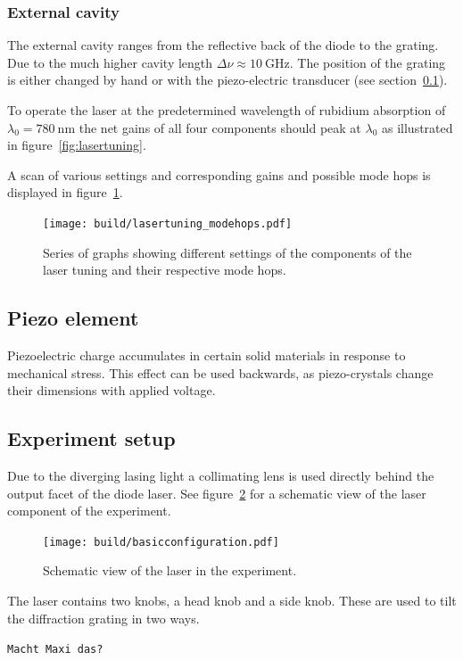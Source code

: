 \subsubsection{External cavity}\label{external-cavity}
The external cavity ranges from the reflective back of the diode to the grating.
Due to the much higher cavity length $\Delta \nu \approx \SI{10}{\giga\hertz}$.
The position of the grating is either changed by hand or with the piezo-electric transducer (see
section~\ref{sub:piezo-element}).

To operate the laser at the predetermined wavelength of rubidium absorption of
$\lambda_0 = \SI{780}{\nano\meter}$ the net gains of all four components should
peak at $\lambda_0$ as illustrated in figure~\ref{fig:lasertuning}.

A scan of various settings and corresponding gains and possible mode hops is
displayed in figure~\ref{fig:lasertuning_modehops}.
\begin{figure}[ht]
  \centering
  \texttt{[image: build/lasertuning\_modehops.pdf]}
  \caption{Series of graphs showing different settings of the  components of
    the laser tuning and their respective mode hops\cite{anleitung}.}%
  \label{fig:lasertuning_modehops}
\end{figure}

\subsection{Piezo element}\label{sub:piezo-element}
Piezoelectric charge accumulates in certain solid materials in response to mechanical stress.
This effect can be used backwards, as piezo-crystals change their dimensions with applied voltage.

\subsection{Experiment setup}\label{experiment-setup}
Due to the diverging lasing light a collimating lens is used directly behind the output facet of
the diode laser.
See figure~\ref{fig:experiment-setup} for a schematic view of the laser component of the
experiment.

\begin{figure}[ht]
  \centering
  \texttt{[image: build/basicconfiguration.pdf]}
  \caption{Schematic view of the laser in the experiment\cite{anleitung}.}%
  \label{fig:experiment-setup}
\end{figure}

The laser contains two knobs, a head knob and a side knob.
These are used to tilt the diffraction grating in two ways.

\texttt{Macht Maxi das?}
